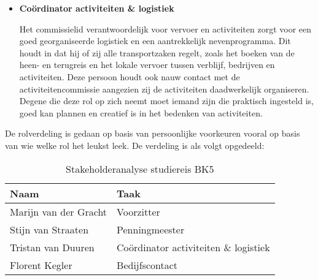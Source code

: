 \begin{itemize}
	\vspace{1cm}
	
	\item \textbf{Coördinator activiteiten \& logistiek}
	
	Het commissielid verantwoordelijk voor vervoer en activiteiten zorgt voor een goed georganiseerde logistiek en een aantrekkelijk nevenprogramma. Dit houdt in dat hij of zij alle transportzaken regelt, zoals het boeken van de heen- en terugreis en het lokale vervoer tussen verblijf, bedrijven en activiteiten. Deze persoon houdt ook nauw contact met de activiteitencommissie aangezien zij de activiteiten daadwerkelijk organiseren. Degene die deze rol op zich neemt moet iemand zijn die praktisch ingesteld is, goed kan plannen en creatief is in het bedenken van activiteiten.
\end{itemize}

De rolverdeling is gedaan op basis van persoonlijke voorkeuren vooral op basis van wie welke rol het leukst leek. De verdeling is als volgt opgedeeld:

\begin{table}[h!]
	\centering
	\caption{Stakeholderanalyse studiereis BK5}
	\label{tab:taakverdeling}
	\begin{tabular}{|p{3.8cm}|p{3.8cm}|}
		\hline
		\textbf{Naam} & \textbf{Taak}\\
		\hline
		Marijn van der Gracht & Voorzitter\\
		\hline
		Stijn van Straaten & Penningmeester\\
		\hline
		Tristan van Duuren & Coördinator activiteiten \& logistiek\\
		\hline
		Florent Kegler & Bedijfscontact\\
		\hline
	\end{tabular}
\end{table}